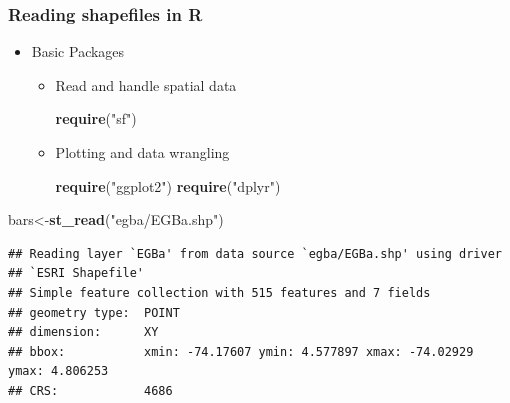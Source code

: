 \documentclass[
  shownotes,
  xcolor={svgnames},
  hyperref={colorlinks,citecolor=DarkBlue,linkcolor=DarkRed,urlcolor=DarkBlue}
   , aspectratio=169]{beamer}
\newenvironment{Shaded}{\begin{snugshade}}{\end{snugshade}}
\newcommand{\KeywordTok}[1]{\textcolor[rgb]{0.13,0.29,0.53}{\textbf{#1}}}
\newcommand{\NormalTok}[1]{#1}
\newcommand{\StringTok}[1]{\textcolor[rgb]{0.31,0.60,0.02}{#1}}
\begin{document}
\begin{frame}[fragile]
\frametitle{Reading shapefiles in R}

\begin{itemize}
    \item Basic Packages
    \begin{itemize}
        \item Read and handle spatial data
        \begin{scriptsize}
        \begin{Shaded}
        \begin{Highlighting}[]
\KeywordTok{require}\NormalTok{(}\StringTok{"sf"}\NormalTok{)}
        \end{Highlighting}
        \end{Shaded}
        \end{scriptsize}
        \item Plotting and data wrangling
        \begin{scriptsize}
        \begin{Shaded}
        \begin{Highlighting}[]
\KeywordTok{require}\NormalTok{(}\StringTok{"ggplot2"}\NormalTok{)}
\KeywordTok{require}\NormalTok{(}\StringTok{"dplyr"}\NormalTok{)}
        \end{Highlighting}
        \end{Shaded}
        \end{scriptsize}
    \end{itemize}   
\end{itemize}

\begin{scriptsize}
\begin{Shaded}
\begin{Highlighting}[]
\NormalTok{bars\textless{}{-}}\KeywordTok{st\_read}\NormalTok{(}\StringTok{"egba/EGBa.shp"}\NormalTok{)}
\end{Highlighting}
\end{Shaded}

\begin{verbatim}
## Reading layer `EGBa' from data source `egba/EGBa.shp' using driver 
## `ESRI Shapefile'
## Simple feature collection with 515 features and 7 fields
## geometry type:  POINT
## dimension:      XY
## bbox:           xmin: -74.17607 ymin: 4.577897 xmax: -74.02929 ymax: 4.806253
## CRS:            4686
\end{verbatim}

\end{scriptsize}

\end{frame}
\end{document}
